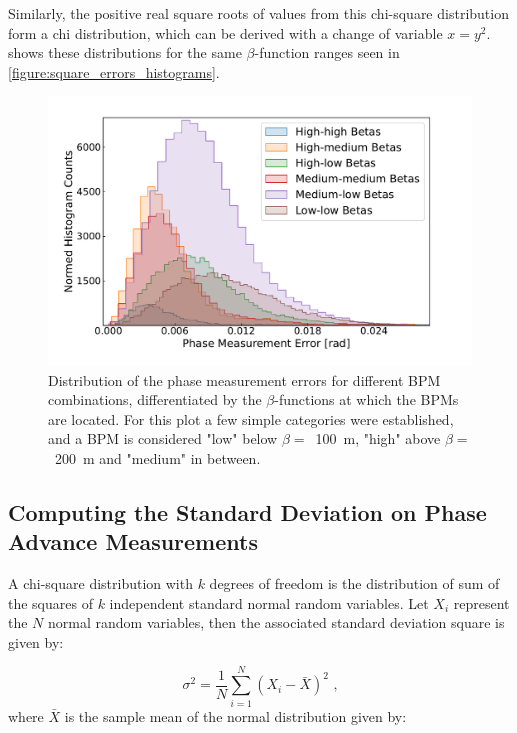 Similarly, the positive real square roots of values from this chi-square distribution form a chi distribution, which can be derived with a change of variable \(x=y^2\).
 shows these distributions for the same \(\beta\)-function ranges seen in \cref{figure:square_errors_histograms}.

\begin{figure}[!htb]
    \centering
    \includegraphics*[width=\textwidth]{Figures/Other_Studies/phase_errors_distributions.pdf}
    \caption{Distribution of the phase measurement errors for different BPM combinations, differentiated by the \(\beta\)-functions at which the BPMs are located. For this plot a few simple categories were established, and a BPM is considered "low" below \(\beta =\)~\qty{100}{\meter}, "high" above \(\beta =\)~\qty{200}{\meter} and "medium" in between.}
    \label{figure:phase_errors_histograms}
\end{figure}

\subsection{Computing the Standard Deviation on Phase Advance Measurements}

A chi-square distribution with \(k\) degrees of freedom  is the distribution of sum of the squares of \(k\) independent standard normal random variables.
Let \(X_{i}\) represent the \(N\) normal random variables, then the associated standard deviation square is given by:

\begin{equation}
    \sigma^{2} = \frac{1}{N} \sum_{i=1}^{N} \left( X_{i} - \bar{X} \right)^{2} \text{ ,}
    \label{equation:chi2_dist_build_from_normals}
\end{equation}
where \(\bar{X}\) is the sample mean of the normal distribution given by:

